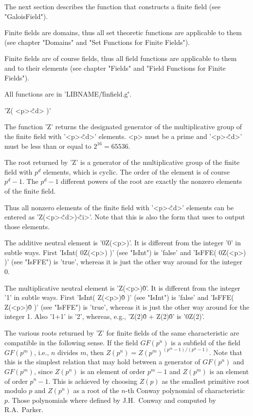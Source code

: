 The next section  describes  the  function that constructs a finite field
(see "GaloisField").

Finite  fields  are  domains,  thus  all  set  theoretic   functions  are
applicable to them (see  chapter "Domains" and "Set Functions  for Finite
Fields").

Finite  fields  are  of course  fields,  thus  all  field  functions  are
applicable to them and to their elements (see chapter "Fields" and "Field
Functions for Finite Fields").

All functions are in 'LIBNAME/\"finfield.g\"'.

%

'Z( <p>\^<d> )'

The function 'Z' returns  the designated generator of  the multiplicative
group of the finite field with '<p>\^<d>' elements.  <p>  must be a prime
and '<p>\^<d>' must be less than or equal to $2^{16} = 65536$.

The  root returned by 'Z' is  a generator of  the multiplicative group of
the finite field with $p^d$ elements, which  is cyclic.  The order of the
element is  of course $p^d-1$.  The $p^d-1$  different powers of the root
are exactly the nonzero elements of the finite field.

Thus  all nonzero elements of the  finite field  with '<p>\^<d>' elements
can  be entered  as 'Z(<p>\^<d>)\^<i>'.  Note that this is  also the form
that {\GAP} uses to output those elements.

The additive neutral element  is '0\*Z(<p>)'.  It  is  different from the
integer '0' in subtle ways.  First 'IsInt( 0\*Z(<p>)  )' (see "IsInt") is
'false' and 'IsFFE( 0\*Z(<p>) )'  (see "IsFFE") is  'true', whereas it is
just the other way around for the integer 0.

The multiplicative neutral element is 'Z(<p>)\^0'.   It is different from
the integer '1' in subtle ways.  First 'IsInt( Z(<p>)\^0 )' (see "IsInt")
is 'false' and 'IsFFE( Z(<p>)\^0 )' (see  "IsFFE") is  'true', whereas it
is just the  other  way around for   the  integer 1.  Also '1+1'  is '2',
whereas, e.g., 'Z(2)\^0 + Z(2)\^0' is '0\*Z(2)'.

The  various  roots  returned  by  'Z'  for  finite  fields  of the  same
characteristic  are  compatible  in  the  following  sense.  If the field
$GF(p^n)$ is a  subfield of the  field  $GF(p^m)$, i.e., $n$ divides $m$,
then $Z(p^n) = Z(p^m)^{(p^m-1)/(p^n-1)}$.  Note that this is the simplest
relation that may  hold  between a generator of $GF(p^n)$ and  $GF(p^m)$,
since $Z(p^n)$ is an element of order $p^m-1$ and $Z(p^m)$  is an element
of order  $p^n-1$.  This is achieved  by choosing $Z(p)$ as  the smallest
primitive  root modulo $p$  and  $Z(p^n)$ as a root of the $n$-th  Conway
polynomial of  characteristic $p$.   Those polynomials  where  defined by
J.H.~Conway and computed by R.A.~Parker.

